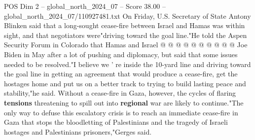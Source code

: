 \begin{textsample}{POS Dim 2 – global\_north\_2024\_07 – Score 38.00 – global\_north\_2024\_07/110927481.txt}
On Friday, U.S.
Secretary of State Antony Blinken said that a long-sought cease-fire between Israel and Hamas was within sight, and that negotiators were"driving toward the goal line."He told the Aspen Security Forum in Colorado that Hamas and Israel @ @ @ @ @ @ @ @ @ @ Joe Biden in May after a lot of pushing and diplomacy, but said that some issues needed to be resolved."I believe we ' re inside the 10-yard line and driving toward the goal line in getting an agreement that would produce a cease-fire, get the hostages home and put us on a better track to trying to build lasting peace and stability,"he said.
Without a cease-fire in Gaza, however, the cycles of flaring \textbf{tensions} threatening to spill out into \textbf{regional} war are likely to continue."The only way to defuse this escalatory crisis is to reach an immediate cease-fire in Gaza that stops the bloodletting of Palestinians and the tragedy of Israeli hostages and Palestinians prisoners,"Gerges said.

\end{textsample}
